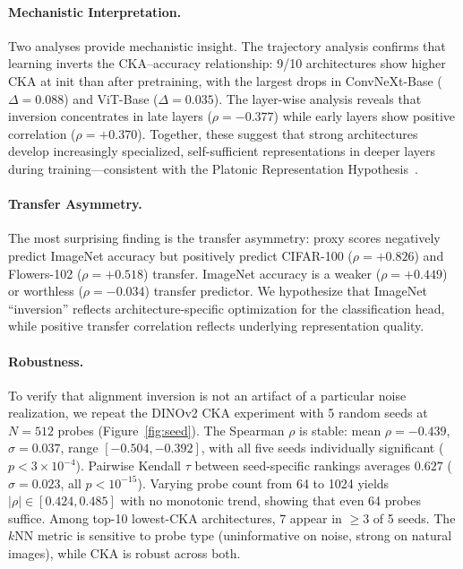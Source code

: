 \documentclass[10pt,twocolumn,letterpaper]{article}
\begin{document}
\paragraph{Mechanistic Interpretation.}
Two analyses provide mechanistic insight.
The trajectory analysis confirms that learning inverts the CKA--accuracy relationship: 9/10 architectures show higher CKA at init than after pretraining, with the largest drops in ConvNeXt-Base ($\Delta = 0.088$) and ViT-Base ($\Delta = 0.035$).
The layer-wise analysis reveals that inversion concentrates in late layers ($\rho = -0.377$) while early layers show positive correlation ($\rho = +0.370$).
Together, these suggest that strong architectures develop increasingly specialized, self-sufficient representations in deeper layers during training---consistent with the Platonic Representation Hypothesis~\cite{huh2024platonic}.

\paragraph{Transfer Asymmetry.}
The most surprising finding is the transfer asymmetry: proxy scores negatively predict ImageNet accuracy but positively predict CIFAR-100 ($\rho = +0.826$) and Flowers-102 ($\rho = +0.518$) transfer.
ImageNet accuracy is a weaker ($\rho = +0.449$) or worthless ($\rho = -0.034$) transfer predictor.
We hypothesize that ImageNet ``inversion'' reflects architecture-specific optimization for the classification head, while positive transfer correlation reflects underlying representation quality.

\paragraph{Robustness.}
To verify that alignment inversion is not an artifact of a particular noise realization, we repeat the DINOv2 CKA experiment with 5 random seeds at $N{=}512$ probes (Figure~\ref{fig:seed}).
The Spearman $\rho$ is stable: mean $\rho = -0.439$, $\sigma = 0.037$, range $[-0.504, -0.392]$, with all five seeds individually significant ($p < 3 \times 10^{-4}$).
Pairwise Kendall $\tau$ between seed-specific rankings averages $0.627$ ($\sigma = 0.023$, all $p < 10^{-15}$).
Varying probe count from 64 to 1024 yields $|\rho| \in [0.424, 0.485]$ with no monotonic trend, showing that even 64 probes suffice.
Among top-10 lowest-CKA architectures, 7 appear in $\geq 3$ of 5 seeds.
The $k$NN metric is sensitive to probe type (uninformative on noise, strong on natural images), while CKA is robust across both.
\end{document}
